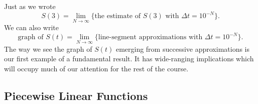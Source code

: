 Just as we wrote
\[
S(3) = \lim_{N \to \infty}\{\mbox{the estimate of $S(3)$ 
		with $\Delta t = 10^{-N}$}\}.
\]
We can also write 
\[
\mbox{graph of } S(t) =\lim_{N \to \infty}
		\{\mbox{line-segment approximations with $\Delta t = 
		10^{-N}$}\}.
\] 
The way we see the graph of $S(t)$ emerging from successive
 approximations is our first example of a fundamental result. It has
 wide-ranging implications which will occupy much of our attention for
 the rest of the course.



\subsection{Piecewise Linear Functions}
\label{subsec:piecewise-linear-functions}

